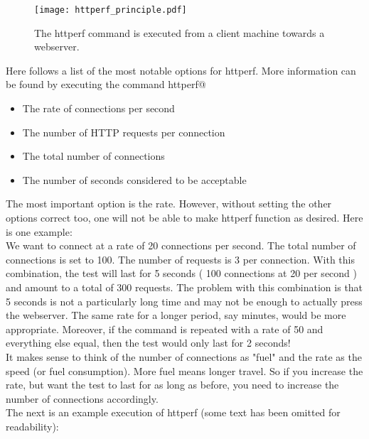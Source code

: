 \begin{figure}[ht!]
\begin{centering}
\texttt{[image: httperf\_principle.pdf]}
\caption{ The httperf command is executed from a client machine towards a webserver. }
\label{httperf}
\end{centering}
\end{figure}

Here follows a list of the most notable options for httperf. More information can be found by executing the command \Verb@man httperf@

\begin{itemize}
	\item The rate of connections per second
	\item The number of HTTP requests per connection
	\item The total number of connections
	\item The number of seconds considered to be acceptable
\end{itemize}

The most important option is the rate. However, without setting the other options correct too, one will not be able to make httperf function as desired. Here is one example:\\

We want to connect at a rate of 20 connections per second. The total number of connections is set to 100. The number of requests is 3 per connection. With this combination, the test will last for 5 seconds ( 100 connections at 20 per second ) and amount to a total of 300 requests. The problem with this combination is that 5 seconds is not a particularly long time and may not be enough to actually press the webserver. The same rate for a longer period, say minutes, would be more appropriate. Moreover, if the command is repeated with a rate of 50 and everything else equal, then the test would only last for 2 seconds!\\

It makes sense to think of the number of connections as "fuel" and the rate as the speed (or fuel consumption). More fuel means longer travel. So if you increase the rate, but want the test to last for as long as before, you need to increase the number of connections accordingly.\\

The next is an example execution of httperf (some text has been omitted for readability):

